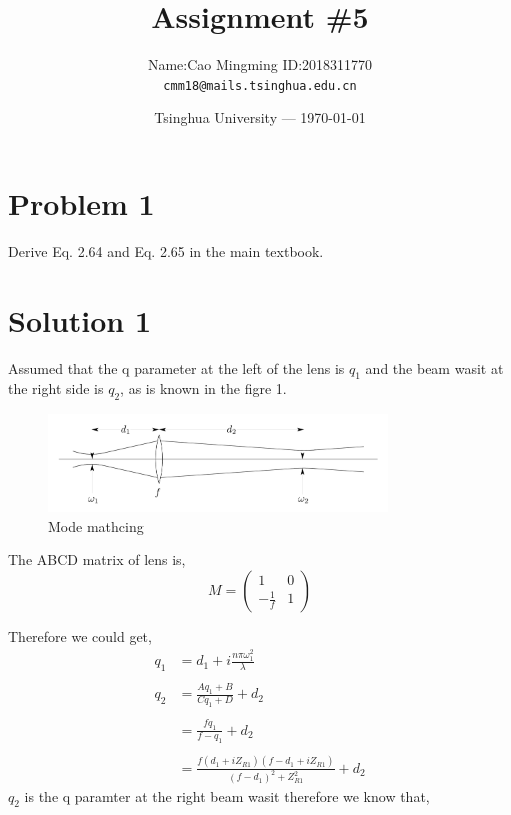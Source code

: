 \documentclass{article}
\title{Assignment \#5}
\author{Name:Cao Mingming \indent \indent ID:2018311770\\ \texttt{cmm18@mails.tsinghua.edu.cn}}
\date{Tsinghua University --- \today}
\begin{document}
\maketitle %

\section{Problem 1} %

Derive Eq. 2.64 and Eq. 2.65 in the main textbook.
\section*{Solution 1}
Assumed that the q parameter at the left of the lens is $q_1$ and the beam wasit at the right side is $q_2$, as is known in the figre 1.
\begin{figure}[h]
    \centering
    \includegraphics[width=9cm]{f1.png}
    \caption{Mode mathcing}
    \label{fig1}
\end{figure}
The ABCD matrix of lens is,
\begin{equation}\label{eq1}
	M=
    \begin{pmatrix}
         1 & 0 \\
         -\frac{1}{f}  & 1
    \end{pmatrix}
\end{equation}

Therefore we could get,
\begin{equation}\label{eq2}
    \begin{aligned}
        q_1&=d_1+i\frac{n\pi\omega_1^2}{\lambda}
        \\ 
        \\
        q_2&=\frac{Aq_1+B}{Cq_1+D}+d_2\\
        \\
        &=\frac{fq_1}{f-q_1}+d_2
        \\
        \\
        &=\frac{f(d_1+iZ_{R1})(f-d_1+iZ_{R1})}{(f-d_1)^2+Z_{R1}^2}+d_2
    \end{aligned}
\end{equation}
$q_2$ is the q paramter at the right beam wasit therefore we know that,
\end{document}
